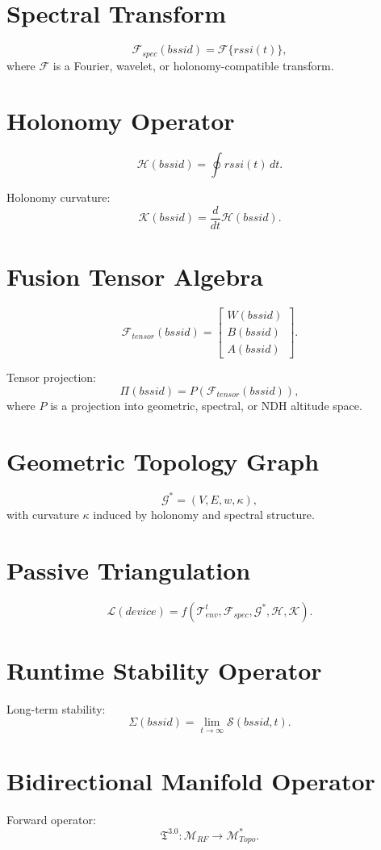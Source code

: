 \documentclass[11pt]{article}
\begin{document}
\section{Spectral Transform}
\[
\mathcal{F}_{spec}(bssid) = \mathcal{F}\{rssi(t)\},
\]
where $\mathcal{F}$ is a Fourier, wavelet, or holonomy-compatible transform.

\section{Holonomy Operator}
\[
\mathcal{H}(bssid) = \oint rssi(t)\, dt.
\]

Holonomy curvature:
\[
\mathcal{K}(bssid) = \frac{d}{dt}\mathcal{H}(bssid).
\]

\section{Fusion Tensor Algebra}
\[
\mathcal{F}_{tensor}(bssid) =
\begin{bmatrix}
W(bssid) \\
B(bssid) \\
A(bssid)
\end{bmatrix}.
\]

Tensor projection:
\[
\Pi(bssid) = P(\mathcal{F}_{tensor}(bssid)),
\]
where $P$ is a projection into geometric, spectral, or NDH altitude space.

\section{Geometric Topology Graph}
\[
\mathcal{G}^{\ast} = (V,E,w,\kappa),
\]
with curvature $\kappa$ induced by holonomy and spectral structure.

\section{Passive Triangulation}
\[
\mathcal{L}(device)
= f(\mathcal{T}_{env}^{t},\mathcal{F}_{spec},\mathcal{G}^{\ast},\mathcal{H},\mathcal{K}).
\]

\section{Runtime Stability Operator}
Long-term stability:
\[
\Sigma(bssid) = \lim_{t\to\infty} \mathcal{S}(bssid,t).
\]

\section{Bidirectional Manifold Operator}
Forward operator:
\[
\mathfrak{T}^{3.0} : \mathcal{M}_{RF} \to \mathcal{M}_{Topo}^{\ast}.
\]
\end{document}
